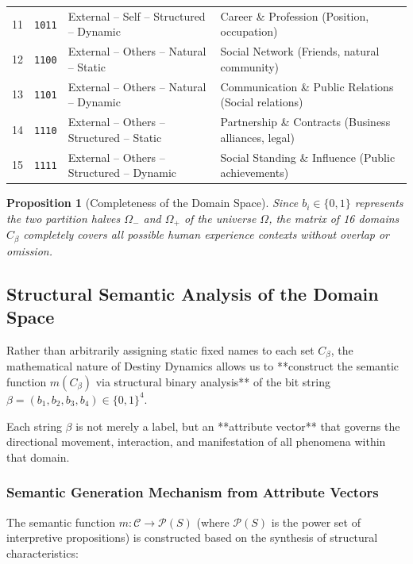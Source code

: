 \documentclass[a4paper,14pt, twoside]{memoir}
\newtheorem{md}{Proposition}[chapter]
\begin{document}
\begin{table}[htbp]
\begin{tabular}{ccll}
		11           & \texttt{1011}       & External -- Self -- Structured -- Dynamic   & Career \& Profession (Position, occupation)      \\
		12           & \texttt{1100}       & External -- Others -- Natural -- Static     & Social Network (Friends, natural community)      \\
		13           & \texttt{1101}       & External -- Others -- Natural -- Dynamic    & Communication \& Public Relations (Social relations)\\
		14           & \texttt{1110}       & External -- Others -- Structured -- Static  & Partnership \& Contracts (Business alliances, legal)\\
		15           & \texttt{1111}       & External -- Others -- Structured -- Dynamic  & Social Standing \& Influence (Public achievements)\\
		\bottomrule
	\end{tabular}
\end{table}

\begin{md}[Completeness of the Domain Space]
	Since $b_i \in \{0,1\}$ represents the two partition halves $\Omega_-$ and $\Omega_+$ of the universe $\Omega$, the matrix of 16 domains $C_\beta$ completely covers all possible human experience contexts without overlap or omission.
\end{md}

\subsection{Structural Semantic Analysis of the Domain Space}

Rather than arbitrarily assigning static fixed names to each set $C_\beta$, the mathematical nature of Destiny Dynamics allows us to **construct the semantic function $m(C_\beta)$ via structural binary analysis** of the bit string $\beta = (b_1, b_2, b_3, b_4) \in \{0,1\}^4$.

Each string $\beta$ is not merely a label, but an **attribute vector** that governs the directional movement, interaction, and manifestation of all phenomena within that domain.

\subsubsection{Semantic Generation Mechanism from Attribute Vectors}

The semantic function $m: \mathcal{C} \rightarrow \mathcal{P}(S)$ (where $\mathcal{P}(S)$ is the power set of interpretive propositions) is constructed based on the synthesis of structural characteristics:
\end{document}

